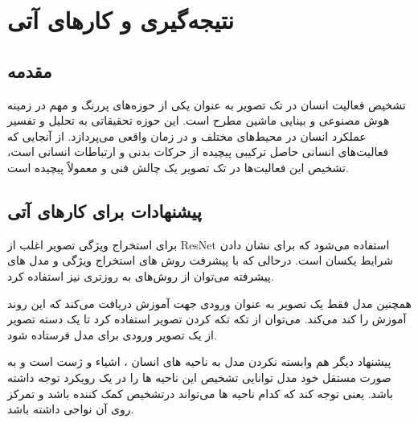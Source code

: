 \chapter{نتیجه‌گیری و کارهای آتی}
\section{مقدمه}
تشخیص فعالیت انسان در تک تصویر به عنوان یکی از حوزه‌های پررنگ و مهم در زمینه هوش مصنوعی و بینایی ماشین مطرح است. این حوزه تحقیقاتی به تحلیل و تفسیر عملکرد انسان در محیط‌های مختلف و در زمان واقعی می‌پردازد. از آنجایی که فعالیت‌های انسانی حاصل ترکیبی پیچیده از حرکات بدنی و ارتباطات انسانی است، تشخیص این فعالیت‌ها در تک تصویر یک چالش فنی و معمولاً پیچیده است.

\section{پیشنهادات برای کارهای آتی}
برای استخراج ویژگی تصویر اغلب از ResNet استفاده می‌شود که برای نشان دادن شرایط یکسان است. درحالی که با پیشرفت روش های استخراج ویژگی و مدل های پیشرفته می‌توان از روش‌های به روزتری نیز استفاده کرد.

همچنین مدل فقط یک تصویر به عنوان ورودی جهت آموزش دریافت می‌کند که این روند آموزش را کند می‌کند. می‌توان از تکه تکه کردن تصویر استفاده کرد تا یک دسته تصویر از یک تصویر ورودی برای مدل فرستاده شود.

پیشنهاد دیگر هم وابسته نکردن مدل به ناحیه های انسان ، اشیاء و ژست است و به صورت مستقل خود مدل توانایی تشخیص این ناحیه ها را در یک رویکرد توجه داشته باشد. یعنی توجه کند که کدام ناحیه ها می‌تواند درتشخیص کمک کننده باشد و تمرکز روی آن نواحی داشته باشد.


